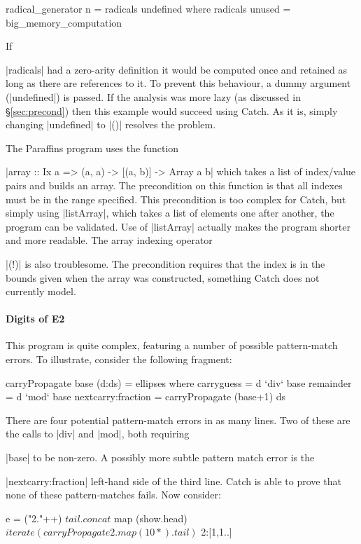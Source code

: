 \documentclass[preprint]{sigplanconf}
\begin{document}
\begin{code}
radical_generator n = radicals undefined
  where radicals unused = big_memory_computation
\end{code}

If \ignore|radicals| had a zero-arity definition it would be computed once and retained as long as there are references to it. To prevent this behaviour, a dummy argument (|undefined|) is passed. If the analysis was more lazy (as discussed in \S\ref{sec:precond}) then this example would succeed using Catch. As it is, simply changing |undefined| to |()| resolves the problem.

The Paraffins program uses the function \ignore|array :: Ix a => (a, a) -> [(a, b)] -> Array a b| which takes a list of index/value pairs and builds an array. The precondition on this function is that all indexes must be in the range specified. This precondition is too complex for Catch, but simply using |listArray|, which takes a list of elements one after another, the program can be validated. Use of |listArray| actually makes the program shorter and more readable. The array indexing operator \ignore|(!)| is also troublesome. The precondition requires that the index is in the bounds given when the array was constructed, something Catch does not currently model.


\paragraph{Digits of E2}

This program is quite complex, featuring a number of possible pattern-match errors. To illustrate, consider the following fragment:

\begin{code}
carryPropagate base (d:ds) = ellipses
  where  carryguess = d `div` base
         remainder = d `mod` base
         nextcarry:fraction = carryPropagate (base+1) ds
\end{code}

\noindent There are four potential pattern-match errors in as many lines. Two of these are the calls to |div| and |mod|, both requiring \ignore|base| to be non-zero. A possibly more subtle pattern match error is the \ignore|nextcarry:fraction| left-hand side of the third line. Catch is able to prove that none of these pattern-matches fails. Now consider:

\begin{code}
e =  ("2."++) $
     tail . concat $
     map (show.head) $
     iterate (carryPropagate 2 . map (10*) . tail) $
     2:[1,1..]
\end{code}
\end{document}
